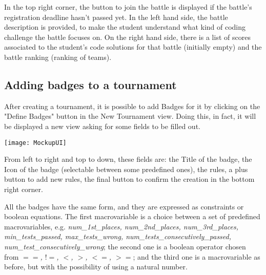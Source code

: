 In the top right corner, the button to join the battle is displayed if the battle's registration deadline hasn't passed yet. 
In the left hand side, the battle description is provided, to make the student understand what kind of coding challenge the battle focuses on. On the right hand side, there is a list of scores associated to the student's code solutions for that battle (initially empty) and the battle ranking (ranking of teams).

\begin{minipage}{\linewidth}
	\subsection{Adding badges to a tournament}
	After creating a tournament, it is possible to add Badges for it by clicking on the "Define Badges" button in the New Tournament view. Doing this, in fact, it will be displayed a new view asking for some fields to be filled out.
	\begin{center}
		\texttt{[image: MockupUI]}
	\end{center}
	
\end{minipage}
From left to right and top to down, these fields are: the Title of the badge, the Icon of the badge (selectable between some predefined ones), the rules, a plus button to add new rules, the final button to confirm the creation in the bottom right corner.
	
All the badges have the same form, and they are expressed as constraints or boolean equations. The first macrovariable is a choice between a set of predefined macrovariables, e.g. \textit{num\_1st\_places, num\_2nd\_places, num\_3rd\_places, min\_tests\_passed, max\_tests\_wrong, num\_tests\_consecutively\_passed, num\_test\_consecutively\_wrong}; the second one is a boolean operator chosen from \textit{$==$, $!=$, $<$, $>$, $<=$, $>=$}; and the third one is a macrovariable as before, but with the possibility of using a natural number.
